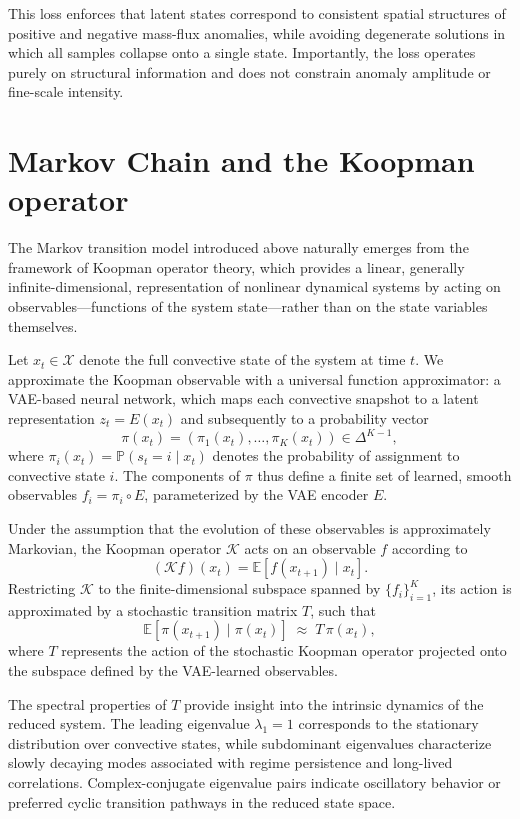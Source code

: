\documentclass[
    aps,
    prl,
    reprint,
    superscriptaddress,
    amsmath,amssymb,
    nofootinbib,
    floatfix
]{revtex4-2}
\begin{document}
This loss enforces that latent states correspond to consistent spatial structures of positive and negative mass-flux anomalies, while avoiding degenerate solutions in which all samples collapse onto a single state. Importantly, the loss operates purely on structural information and does not constrain anomaly amplitude or fine-scale intensity.


\section{Markov Chain and the Koopman operator}

The Markov transition model introduced above naturally emerges from the framework of Koopman operator theory, which provides a linear, generally infinite-dimensional, representation of nonlinear dynamical systems by acting on observables---functions of the system state---rather than on the state variables themselves.

Let $x_t \in \mathcal{X}$ denote the full convective state of the system at time $t$. We approximate the Koopman observable with a universal function approximator: a VAE-based neural network, which maps each convective snapshot to a latent representation $z_t = E(x_t)$ and subsequently to a probability vector
\[
\pi(x_t) = (\pi_1(x_t), \ldots, \pi_K(x_t)) \in \Delta^{K-1},
\]
where $\pi_i(x_t) = \mathbb{P}(s_t = i \mid x_t)$ denotes the probability of assignment to convective state $i$. The components of $\pi$ thus define a finite set of learned, smooth observables $f_i = \pi_i \circ E$, parameterized by the VAE encoder $E$.

Under the assumption that the evolution of these observables is approximately Markovian, the Koopman operator $\mathcal{K}$ acts on an observable $f$ according to
\[
(\mathcal{K} f)(x_t) = \mathbb{E}\!\left[ f(x_{t+1}) \mid x_t \right].
\]
Restricting $\mathcal{K}$ to the finite-dimensional subspace spanned by $\{ f_i \}_{i=1}^K$, its action is approximated by a stochastic transition matrix $T$, such that
\[
\mathbb{E}\!\left[ \pi(x_{t+1}) \mid \pi(x_t) \right] \;\approx\; T \, \pi(x_t),
\]
where $T$ represents the action of the stochastic Koopman operator projected onto the subspace defined by the VAE-learned observables.

The spectral properties of $T$ provide insight into the intrinsic dynamics of the reduced system. The leading eigenvalue $\lambda_1 = 1$ corresponds to the stationary distribution over convective states, while subdominant eigenvalues characterize slowly decaying modes associated with regime persistence and long-lived correlations. Complex-conjugate eigenvalue pairs indicate oscillatory behavior or preferred cyclic transition pathways in the reduced state space.
\end{document}

